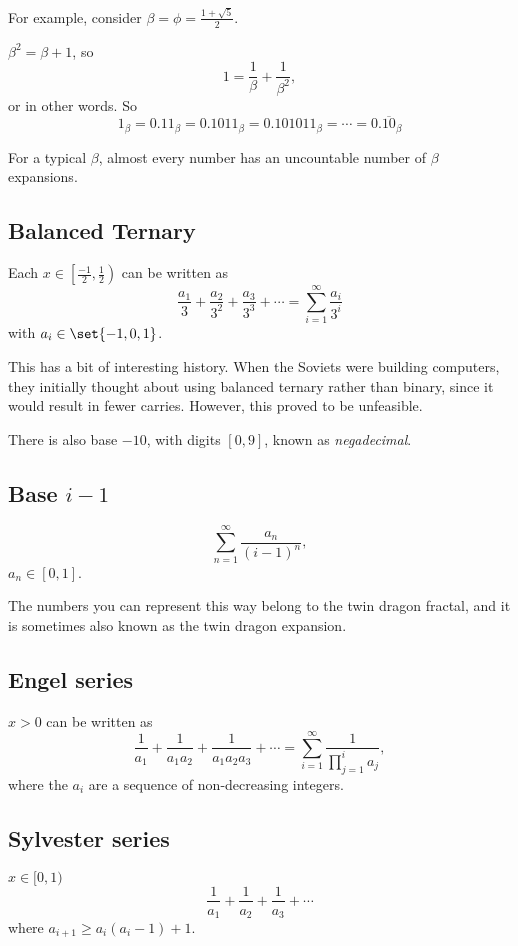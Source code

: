\documentclass{article}
\newcommand\hoint{[0,1)}
\begin{document}
For example, consider $\beta = \phi = \frac{1+\sqrt{5}}{2}$.

$\beta^2 = \beta + 1$, so
\[ 1 = \frac{1}{\beta} + \frac{1}{\beta^2},\]
or in other words.
So
\[ 1_\beta = 0.11_{\beta} = 0.1011_\beta = 0.101011_\beta =
\cdots 
= 0.\overline{10}_\beta\]

For a typical $\beta$, almost every number has an uncountable 
number of $\beta$ expansions.

\subsection{Balanced Ternary}
Each $x\in \left[\frac{-1}{2},\frac{1}{2}\right)$ can be written
as 
\[ \frac{a_1}{3} + \frac{a_2}{3^2} + \frac{a_3}{3^3} + \cdots
= \sum_{i=1}^\infty \frac{a_i}{3^i} \]
with $a_i\in\set{-1,0,1}$.

This has a bit of interesting history. When the Soviets were 
building computers, they initially thought about using
balanced ternary rather than binary, since it would result
in fewer carries. However, this proved to be unfeasible.

There is also base $-10$, with digits $[0,9]$, known as 
\emph{negadecimal}.

\subsection{Base $i-1$}

\[ \sum_{n=1}^\infty \frac{a_n}{(i-1)^n}, \]
$a_n\in [0,1]$.

The numbers you can represent this way belong to the twin dragon
fractal, and it is sometimes also known as the twin dragon 
expansion.

\subsection{Engel series}

$x>0$ can be written as 
\[ \frac{1}{a_1} + \frac{1}{a_1a_2} + \frac{1}{a_1a_2a_3} + \cdots 
= \sum_{i=1}^\infty \frac{1}{\prod_{j=1}^i a_j }, \]
where the $a_i$ are a sequence of non-decreasing integers.

\subsection{Sylvester series}

$x\in \hoint$
\[ \frac{1}{a_1}+\frac{1}{a_2} + \frac{1}{a_3} +\cdots \]
where $a_{i+1} \ge a_i(a_i-1) + 1$.
\end{document}
